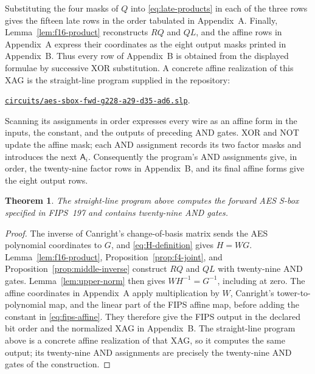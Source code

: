 \documentclass[11pt]{article}
\newtheorem{theorem}{Theorem}
\newcommand{\gate}[1]{\mathsf A_{#1}}
\begin{document}
Substituting the four masks of \(Q\) into \eqref{eq:late-products} in each
of the three rows gives the fifteen late rows in the order tabulated in
Appendix~A.  Finally, Lemma~\ref{lem:f16-product}
reconstructs \(RQ\) and \(QL\), and the affine rows in Appendix~A express
their coordinates as the eight output masks printed in Appendix~B.
Thus every row of Appendix~B is obtained from the displayed formulae by
successive XOR substitution.  A concrete affine realization of this XAG is
the straight-line program supplied in the repository:
\begin{center}
 \href{https://github.com/umizame/S-box_29-AND/blob/master/circuits/aes-sbox-fwd-g228-a29-d35-ad6.slp}{\texttt{circuits/aes-sbox-fwd-\allowbreak g228-a29-d35-ad6.slp}}.
\end{center}

Scanning its assignments in order expresses every wire as an affine form in
the inputs, the constant, and the outputs of preceding AND gates.  XOR and
NOT update the affine mask; each AND assignment records its two factor masks
and introduces the next \(\gate{i}\).  Consequently the program's AND
assignments give, in order, the twenty-nine factor rows in Appendix~B, and
its final affine forms give the eight output rows.

\begin{theorem}\label{thm:main}
The straight-line program above computes the forward AES S-box specified in
FIPS~197 and contains twenty-nine AND gates.
\end{theorem}

\begin{proof}
The inverse of Canright's change-of-basis matrix sends the AES polynomial
coordinates to \(G\), and \eqref{eq:H-definition} gives \(H=WG\).
Lemma~\ref{lem:f16-product},
Proposition~\ref{prop:f4-joint}, and
Proposition~\ref{prop:middle-inverse} construct \(RQ\) and \(QL\) with
twenty-nine AND gates.  Lemma~\ref{lem:upper-norm} then gives
\(WH^{-1}=G^{-1}\), including at zero.  The affine coordinates in
Appendix~A apply multiplication by \(W\), Canright's tower-to-polynomial
map, and the linear part of the FIPS affine map, before adding the constant in
\eqref{eq:fips-affine}.  They therefore give the FIPS output in the declared
bit order and the normalized XAG in Appendix~B.  The straight-line program
above is a concrete affine realization of that XAG, so it computes the same
output; its twenty-nine AND assignments are precisely the twenty-nine AND
gates of the construction.
\end{proof}
\end{document}
